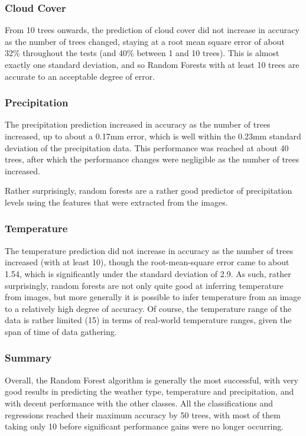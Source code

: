 \documentclass[a4paper,12pt,twoside]{report}
\begin{document}
\subsubsection{Cloud Cover}

From 10 trees onwards, the prediction of cloud cover did not increase in accuracy as the number of trees changed, staying at a root mean square error of about 32\% throughout the tests (and 40\% between 1 and 10 trees). This is almost exactly one standard deviation, and so Random Forests with at least 10 trees are accurate to an acceptable degree of error.

\subsubsection{Precipitation}

The precipitation prediction increased in accuracy as the number of trees increased, up to about a 0.17mm error, which is well within the 0.23mm standard deviation of the precipitation data. This performance was reached at about 40 trees, after which the performance changes were negligible as the number of trees increased.

Rather surprisingly, random forests are a rather good predictor of precipitation levels using the features that were extracted from the images.

\subsubsection{Temperature}

The temperature prediction did not increase in accuracy as the number of trees increased (with at least 10), though the root-mean-square error came to about 1.54\celsius, which is significantly under the standard deviation of 2.9\celsius. As such, rather surprisingly, random forests are not only quite good at inferring temperature from images, but more generally it is possible to infer temperature from an image to a relatively high degree of accuracy.
Of course, the temperature range of the data is rather limited (15\celsius) in terms of real-world temperature ranges, given the span of time of data gathering.

\subsubsection{Summary}
Overall, the Random Forest algorithm is generally the most successful, with very good results in predicting the weather type, temperature and precipitation, and with decent performance with the other classes.
All the classifications and regressions reached their maximum accuracy by 50 trees, with most of them taking only 10 before significant performance gains were no longer occurring.
\end{document}
